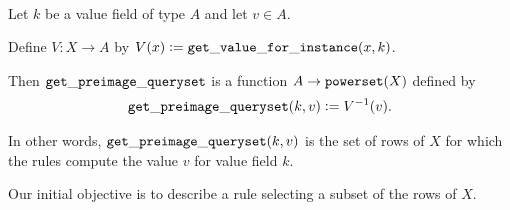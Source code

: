 \documentclass[12pt]{article}
\begin{document}
\begin{definition*}~\\
  Let $k$ be a value field of type $A$ and let $v \in A$.

  Define $V:X \to A$ by $V(x) := {\tt get\_value\_for\_instance}(x, k)$.

  Then ${\tt get\_preimage\_queryset}$ is a function $A \to {\tt powerset}(X)$ defined by\\
  \begin{align*}
  {\tt get\_preimage\_queryset}(k, v) := V^{-1}(v).
  \end{align*}


  In other words, ${\tt get\_preimage\_queryset}(k, v)$ is the set of rows of $X$ for which the
  rules compute the value $v$ for value field $k$.
\end{definition*}



Our initial objective is to describe a rule selecting a subset of the rows of
$X$.
\end{document}
